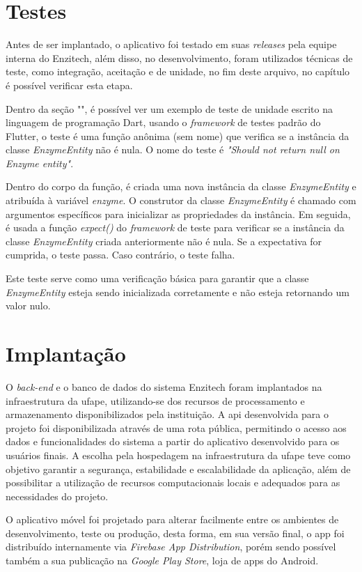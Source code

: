 \section{Testes}
Antes de ser implantado, o aplicativo foi testado em suas \textit{releases} pela equipe interna do Enzitech, além disso, no desenvolvimento, foram utilizados técnicas de teste, como integração, aceitação e de unidade, no fim deste arquivo, no capítulo  é possível verificar esta etapa.

Dentro da seção "", é possível ver um exemplo de teste de unidade escrito na linguagem de programação Dart, usando o \textit{framework} de testes padrão do Flutter, o teste é uma função anônima (sem nome) que verifica se a instância da classe \textit{EnzymeEntity} não é nula. O nome do teste é \textit{"Should not return null on Enzyme entity"}.

Dentro do corpo da função, é criada uma nova instância da classe \textit{EnzymeEntity} e atribuída à variável \textit{enzyme}. O construtor da classe \textit{EnzymeEntity} é chamado com argumentos específicos para inicializar as propriedades da instância. Em seguida, é usada a função \textit{expect()} do \textit{framework} de teste para verificar se a instância da classe \textit{EnzymeEntity} criada anteriormente não é nula. Se a expectativa for cumprida, o teste passa. Caso contrário, o teste falha.

Este teste serve como uma verificação básica para garantir que a classe \textit{EnzymeEntity} esteja sendo inicializada corretamente e não esteja retornando um valor nulo.

\section{Implantação}
O \textit{back-end} e o banco de dados do sistema Enzitech foram implantados na infraestrutura da \ac{ufape}, utilizando-se dos recursos de processamento e armazenamento disponibilizados pela instituição. A \ac{api} desenvolvida para o projeto foi disponibilizada através de uma rota pública, permitindo o acesso aos dados e funcionalidades do sistema a partir do aplicativo desenvolvido para os usuários finais. A escolha pela hospedagem na infraestrutura da \ac{ufape} teve como objetivo garantir a segurança, estabilidade e escalabilidade da aplicação, além de possibilitar a utilização de recursos computacionais locais e adequados para as necessidades do projeto.

O aplicativo móvel foi projetado para alterar facilmente entre os ambientes de desenvolvimento, teste ou produção, desta forma, em sua versão final, o \ac{app} foi distribuído internamente via \textit{Firebase App Distribution}, porém sendo possível também a sua publicação na \textit{Google Play Store}, loja de \acp{app} do Android. 
